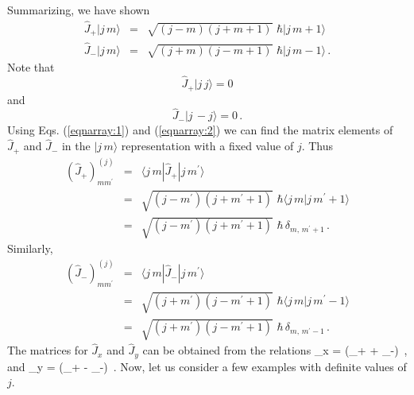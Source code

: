 Summarizing, we have shown
\begin{eqnarray}
\hat{J}_+ |j\, m\rangle &=& \sqrt{(j-m)(j+m+1)}\,\, \hbar |j\, m+1\rangle \label{eqnarray:1} \\ 
\hat{J}_-|j\,m\rangle & = & \sqrt{(j+m)(j-m+1)}\,\, \hbar |j\, m-1\rangle \, .
\label{eqnarray:2}
\end{eqnarray}
Note that
\[ \hat{J}_+ |j\, j\rangle = 0 \]
and
\[ \hat{J}_-|j\, -j\rangle = 0 \, . \]
Using Eqs. (\ref{eqnarray:1}) and (\ref{eqnarray:2}) we can find the matrix elements of $\hat{J}_+$ and $\hat{J}_-$ in the $|j\,m\rangle$ representation
with a fixed value of $j$. Thus
\begin{eqnarray}
\left( \hat{J}_+\right)_{mm^{\prime}}^{(j)} & = & \langle j\, m|\hat{J}_+|j\, m^{\prime}\rangle \nonumber \\
& = & \sqrt{(j-m^{\prime})(j+m^{\prime}+1)}\,\, \hbar \langle j\, m|j\, m^{\prime}+1 \rangle \nonumber \\
& = & \sqrt{(j-m^{\prime})(j+m^{\prime}+1)}\,\, \hbar \, \delta_{m,\, m^{\prime}+1}\, .
\end{eqnarray}	
Similarly,
\begin{eqnarray}
\left( \hat{J}_-\right)_{mm^{\prime}}^{(j)} & = & \langle j\, m|\hat{J}_-|j\, m^{\prime}\rangle \nonumber \\
& = & \sqrt{(j+m^{\prime})(j-m^{\prime}+1)}\,\, \hbar \langle j\, m|j\, m^{\prime}-1 \rangle \nonumber \\
& = & \sqrt{(j+m^{\prime})(j-m^{\prime}+1)}\,\, \hbar \, \delta_{m,\, m^{\prime}-1}\, .
\end{eqnarray}	
The matrices for $\hat{J}_x$ and $\hat{J}_y$ can be obtained from the relations
\be
{}_x = (_+ + _-)\, , 
\ee
and
\be
{}_y = (_+ - _-)\, .
\ee
Now, let us consider a few examples with definite values of $j$.


